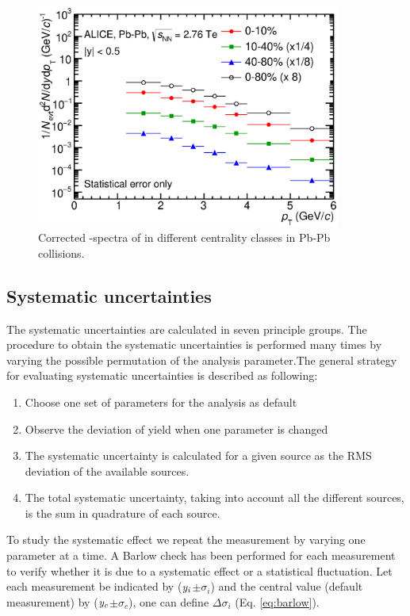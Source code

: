 \begin{figure}[htbp]
\begin{center}
\includegraphics[width=10.0cm]{./Version1/FigChapter5/Spectra/StatSpectraPbPb.eps}
\caption{Corrected \pt-spectra of \xis in different centrality classes in Pb-Pb collisions.} 
 \label{fig:PbPb:rawspectra}
\end{center}
\end{figure}



\newpage
\subsection{Systematic uncertainties}\label{sec:sys} 


The systematic uncertainties are calculated in seven principle groups. The procedure to obtain the systematic uncertainties is performed many times by varying the possible permutation of the analysis parameter.The general strategy for evaluating systematic uncertainties is described as following:

\begin{enumerate}
\item Choose one set of parameters for the analysis as default
\item Observe the deviation of yield when one parameter is changed
\item The systematic uncertainty is calculated for a given source as the RMS deviation of the available sources.
\item The total systematic uncertainty, taking into account all the different sources, is the sum in quadrature of each source.
\end{enumerate}

To study the systematic effect we repeat the measurement by varying one parameter at a time. 
A Barlow \cite{cite:Barlow} check has been performed for each measurement to verify whether it is due to a systematic effect or a statistical fluctuation. Let each measurement be indicated by ($\it{y}_{i}$$\pm$$\sigma_{i}$) and the central value (default measurement) by ($\it{y}_{c}$$\pm$$\sigma_{c}$), one can define $\Delta\sigma_{i}$ (Eq. \ref{eq:barlow}).


